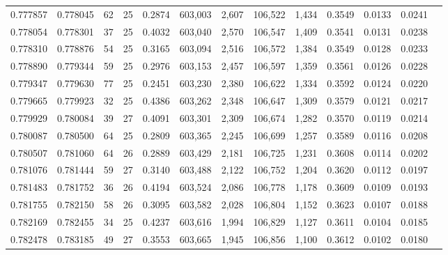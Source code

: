 \begin{tabular}{rrrrrrrrrrrrr}
0.777857 & 0.778045 &  62 &  25 &                                     0.2874 & 603,003 &   2,607 & 106,522 &   1,434 & 0.3549 & 0.0133 & 0.0241 \\
0.778054 & 0.778301 &  37 &  25 &                                     0.4032 & 603,040 &   2,570 & 106,547 &   1,409 & 0.3541 & 0.0131 & 0.0238 \\
0.778310 & 0.778876 &  54 &  25 &                                     0.3165 & 603,094 &   2,516 & 106,572 &   1,384 & 0.3549 & 0.0128 & 0.0233 \\
0.778890 & 0.779344 &  59 &  25 &                                     0.2976 & 603,153 &   2,457 & 106,597 &   1,359 & 0.3561 & 0.0126 & 0.0228 \\
0.779347 & 0.779630 &  77 &  25 &                                     0.2451 & 603,230 &   2,380 & 106,622 &   1,334 & 0.3592 & 0.0124 & 0.0220 \\
0.779665 & 0.779923 &  32 &  25 &                                     0.4386 & 603,262 &   2,348 & 106,647 &   1,309 & 0.3579 & 0.0121 & 0.0217 \\
0.779929 & 0.780084 &  39 &  27 &                                     0.4091 & 603,301 &   2,309 & 106,674 &   1,282 & 0.3570 & 0.0119 & 0.0214 \\
0.780087 & 0.780500 &  64 &  25 &                                     0.2809 & 603,365 &   2,245 & 106,699 &   1,257 & 0.3589 & 0.0116 & 0.0208 \\
0.780507 & 0.781060 &  64 &  26 &                                     0.2889 & 603,429 &   2,181 & 106,725 &   1,231 & 0.3608 & 0.0114 & 0.0202 \\
0.781076 & 0.781444 &  59 &  27 &                                     0.3140 & 603,488 &   2,122 & 106,752 &   1,204 & 0.3620 & 0.0112 & 0.0197 \\
0.781483 & 0.781752 &  36 &  26 &                                     0.4194 & 603,524 &   2,086 & 106,778 &   1,178 & 0.3609 & 0.0109 & 0.0193 \\
0.781755 & 0.782150 &  58 &  26 &                                     0.3095 & 603,582 &   2,028 & 106,804 &   1,152 & 0.3623 & 0.0107 & 0.0188 \\
0.782169 & 0.782455 &  34 &  25 &                                     0.4237 & 603,616 &   1,994 & 106,829 &   1,127 & 0.3611 & 0.0104 & 0.0185 \\
0.782478 & 0.783185 &  49 &  27 &                                     0.3553 & 603,665 &   1,945 & 106,856 &   1,100 & 0.3612 & 0.0102 & 0.0180 \\

\end{tabular}
